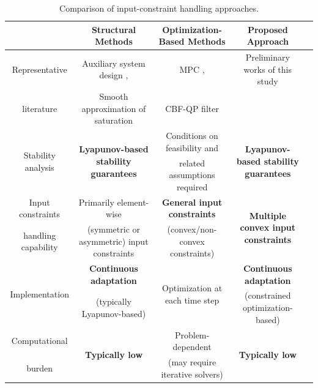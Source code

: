 \documentclass[letterpaper, journal]{IEEEtran}
\begin{document}

\begin{table}[t]
  \renewcommand{\arraystretch}{1.3}
  \caption{
    Comparison of input-constraint handling approaches.
  }
  \centering
  \begin{tabular}{c c c c c }
  \hline
  & 
  \textbf{Structural Methods} 
  & 
  \textbf{Optimization-Based Methods} 
  & 
  \textbf{Proposed Approach}
  \\
  \hline
  \hline %
    Representative 
  & 
  Auxiliary system design \cite{Gao:2017aa,Ma:2025aa,Gao:2026aa,Yang:2021aa,Jia:2020aa,Liu:2024aa,Liu:2025aa,Esfandiari:2014aa,Esfandiari:2015aa,Yu:2022aa,Rezaei:2025aa,He:2016aa,He:2019aa,Zhao:2016aa,Peng:2020aa},
  &
  MPC \cite{Greune:2011aa,Bemporad:1999aa,Berberich:2025aa,Draeger:1995aa,Vahidi-Moghaddam:2025aa,Mallick:2025aa,Khodaverdian:2025aa},
  &
  Preliminary works of this study
  \\
  literature
  &
  Smooth approximation of saturation \cite{Wang:2013aa,Cui:2014aa,Li:2024aa}
  &
  CBF-QP filter \cite{Ames:2019aa,Ko:2025aa,Sweatland:2025aa}
  &
  \cite{Ryu:2025ab,Ryu:2025aa}
  \\
  \hline %
  \multirow{2}{*}{
    Stability analysis 
  }
  & 
  \multirow{2}{*}{
    \textbf{Lyapunov-based stability guarantees}
  }
  & 
  Conditions on feasibility and
  & 
  \multirow{2}{*}{
    \textbf{Lyapunov-based stability guarantees}
  }
  \\
  &
  &
  related assumptions required
  &
  \\
  \hline %
  Input constraints 
  & 
  Primarily element-wise 
  & 
  \textbf{General input constraints}
  &
  \multirow{2}{*}{
  \textbf{Multiple convex input constraints}
  }
  \\
  handling capability
  &
  (symmetric or asymmetric) input constraints
  &
  (convex/non-convex constraints)
  &
  \\
  \hline %
  \multirow{2}{*}{
    Implementation
  }
  &
    \textbf{Continuous adaptation}
  &
  \multirow{2}{*}{
    Optimization at each time step
  }
  &
    \textbf{Continuous adaptation}
  \\
  &
  (typically Lyapunov-based)
  &
  &
  (constrained optimization-based)
  \\
  \hline
    Computational
  &
  \multirow{2}{*}{
    \textbf{Typically low}
  }
  &
  Problem-dependent
  &
  \multirow{2}{*}{
    \textbf{Typically low}
  }
  \\
  burden
  &
  &
  (may require iterative solvers)
  &
  \\
  \hline
  \end{tabular}
  \label{table:intro:comparison}
\end{table}
\end{document}
